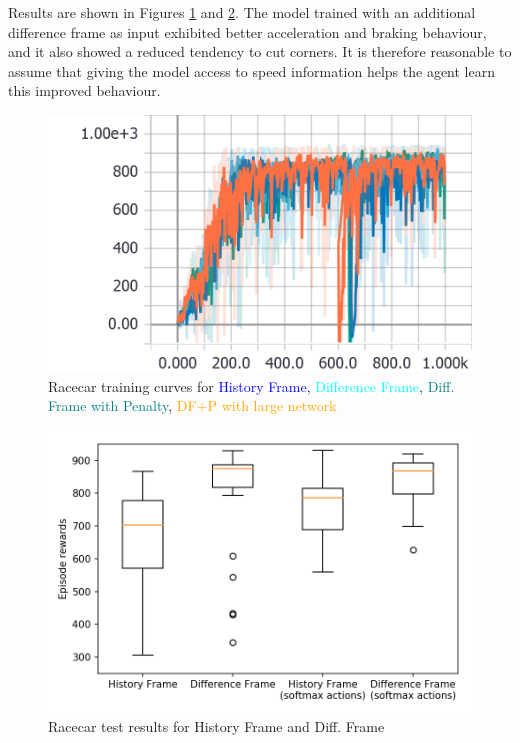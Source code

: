 \documentclass[a4paper, 11pt, conference]{ieeeconf}      %
\begin{document}
Results are shown in Figures \ref{fig:train5678} and \ref{fig:test3}. The model trained with an additional difference frame as input exhibited better acceleration and braking behaviour, and it also showed a reduced tendency to cut corners. It is therefore reasonable to assume that giving the model access to speed information helps the agent learn this improved behaviour.

\begin{figure}
  \includegraphics[width=\linewidth]{figs/racecar_train_5678.png}
  \caption{Racecar training curves for \textcolor{blue}{History Frame}, \textcolor{cyan}{Difference Frame}, \textcolor{teal}{Diff. Frame with Penalty}, \textcolor{orange}{DF+P with large network}}
  \label{fig:train5678}
\end{figure}


\begin{figure}
  \includegraphics[width=\linewidth]{figs/racecar_3.png}
  \caption{Racecar test results for History Frame and Diff. Frame}
  \label{fig:test3}
\end{figure}
\end{document}
